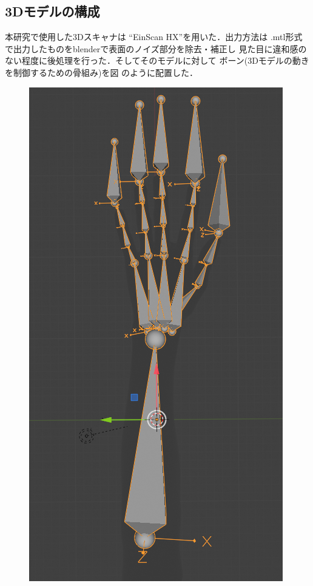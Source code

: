 \documentclass{ltjsarticle}
\begin{document}
	\subsection{3Dモデルの構成}
		本研究で使用した3Dスキャナは ``EinScan HX''を用いた．出力方法は
		.mtl形式で出力したものをblenderで表面のノイズ部分を除去・補正し
		見た目に違和感のない程度に後処理を行った．そしてそのモデルに対して
		ボーン(3Dモデルの動きを制御するための骨組み)を図
		のように配置した．
		\begin{figure}[H]
		\centering
		\begin{minipage}{0.23\columnwidth}
		\centering
		\includegraphics[width = \columnwidth]{figs/handbone.png}

\end{minipage}
\end{figure}
\end{document}
